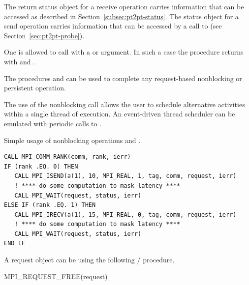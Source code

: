 The return status object for a receive operation carries information that
can be accessed as described in
Section~\ref{subsec:pt2pt-status}.
The status object for a send operation carries information that can be
accessed by
a call to 
(see Section~\ref{sec:pt2pt-probe}).

One
is allowed to call  with a  or  
argument. In such a case the procedure returns with  and
 .

The procedures  and  can be used to
complete any request-based nonblocking or persistent operation.

\begin{users}
The use of
the nonblocking  call allows the user to
schedule alternative activities within a single thread of execution.
An event-driven thread scheduler can be emulated with periodic calls to
.
\end{users}


\begin{example}
\label{pt2pt-exJ}
%
%
Simple usage of nonblocking operations and .
\begin{lstlisting}[language={[MPI]Fortran}]
CALL MPI_COMM_RANK(comm, rank, ierr)
IF (rank .EQ. 0) THEN
   CALL MPI_ISEND(a(1), 10, MPI_REAL, 1, tag, comm, request, ierr)
   ! **** do some computation to mask latency ****
   CALL MPI_WAIT(request, status, ierr)
ELSE IF (rank .EQ. 1) THEN
   CALL MPI_IRECV(a(1), 15, MPI_REAL, 0, tag, comm, request, ierr)
   ! **** do some computation to mask latency ****
   CALL MPI_WAIT(request, status, ierr)
END IF
\end{lstlisting}
\end{example}

A request object can be  using the following \MPI/ procedure.

\begin{funcdef}{MPI\_REQUEST\_FREE}{(\mbox{request})}
\end{funcdef}

